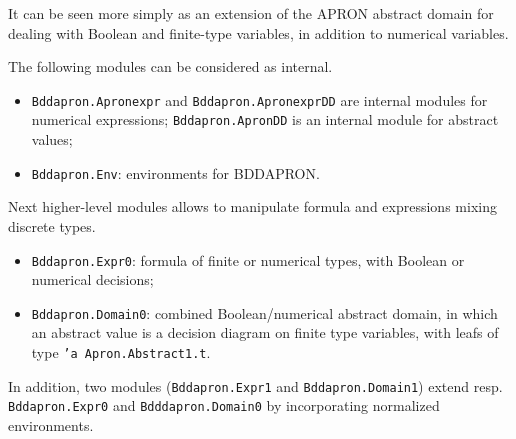 \documentclass[twoside,10pt,a4paper]{report}
\begin{document}
It can be seen more simply as an extension of the APRON abstract
domain for dealing with Boolean and finite-type variables, in
addition to numerical variables.

The following modules can be considered as internal.
\begin{itemize}
\item \texttt{Bddapron.Apronexpr} and
  \texttt{Bddapron.ApronexprDD} are internal modules for numerical
  expressions; \texttt{Bddapron.ApronDD} is an internal module for
  abstract values;
\item \texttt{Bddapron.Env}: environments for BDDAPRON.
\end{itemize}

Next higher-level modules allows to manipulate formula and
expressions mixing discrete types.
\begin{itemize}
\item \texttt{Bddapron.Expr0}: formula of finite or numerical types,
  with Boolean or numerical decisions;
\item \texttt{Bddapron.Domain0}: combined Boolean/numerical abstract
  domain, in which an abstract value is a decision diagram on
  finite type variables, with leafs of type \texttt{'a
    Apron.Abstract1.t}.
\end{itemize}
In addition, two modules (\texttt{Bddapron.Expr1} and
\texttt{Bddapron.Domain1}) extend resp. \texttt{Bddapron.Expr0}
and \texttt{Bdddapron.Domain0} by incorporating normalized
environments.


\end{document}
